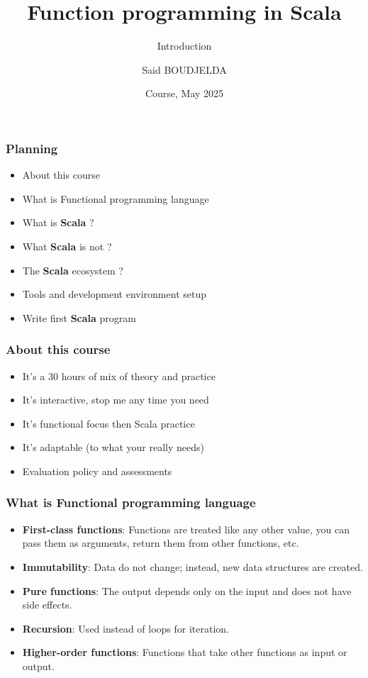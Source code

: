 \documentclass{beamer}
\title[Scala] %
{Function programming in Scala}
\subtitle{Introduction}
\author[Said BOUDJELDA] %
{Said BOUDJELDA}
\institute[efrei] %
{
  Senior Software Engineer @SCIAM\\
  Email : mohamed-said.boudjelda@intervenants.efrei.net \\ 
  Follow me on GitHub @bmscomp
}
\date[efrei 2025] %
{Course, May 2025}
\begin{document}
\frame{\titlepage}

\begin{frame}
\frametitle{Planning}


\begin{itemize}
    \item About this course 
    \item What is Functional programming language
    \item What is \textbf{Scala} ? 
    \item What \textbf{Scala} is not ? 
    \item The \textbf{Scala} ecosystem ? 
    \item Tools and development environment setup
    \item Write first \textbf{Scala} program
\end{itemize}
\end{frame}


\begin{frame}
\frametitle{About this course}

\begin{itemize}
    \item It's a 30 hours of mix of theory and practice
    \item It's interactive, stop me any time you need
    \item It's functional focus then Scala practice
    \item It's adaptable (to what your really needs)
    \item Evaluation policy and assessments
\end{itemize}
\end{frame}



\begin{frame}
\frametitle{What is Functional programming language}

\begin{itemize}
    \item \textbf{First-class functions}: Functions are treated like any other value, you can pass them as arguments, return them from other functions, etc.
    \item \textbf{Immutability}: Data do not change; instead, new data structures are created.
    \item \textbf{Pure functions}: The output depends only on the input and does not have side effects.
    \item \textbf{Recursion}: Used instead of loops for iteration.
    \item \textbf{Higher-order functions}: Functions that take other functions as input or output.
\end{itemize}
\end{frame}
\end{document}
